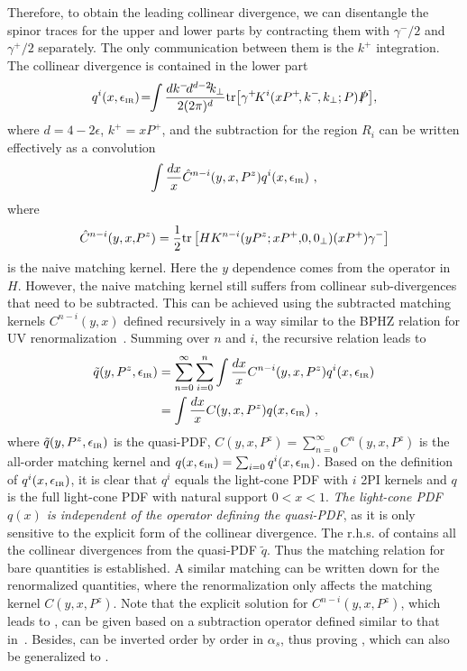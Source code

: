 Therefore, to obtain the leading collinear divergence, we can disentangle the spinor traces for the upper and lower parts by contracting them with $\gamma^-/2$ and $\gamma^+/2$ separately. The only communication between them is the $k^+$ integration. The collinear divergence is contained in the lower part
\begin{align}
	q^{i}(x,\epsilon_{\mbox{\tiny IR}})\!=\!\!\int \frac{dk^-\!d^{d-2}\!k_\perp}{2(2\pi)^{d}}{\rm tr} \big[\gamma^+\! K^i(xP^+\!,k^-\!,k_\perp;P)\slashed{P}\big],
\end{align}
where $d=4-2\epsilon$, $k^+=xP^+$, and the subtraction for the region $R_i$ can be written effectively as a convolution
\begin{align}
	\int \frac{dx}{x} \hat C^{n-i}(y,x,P^z)q^i(x,\epsilon_{\mbox{\tiny IR}}) \ ,
\end{align}
where
\begin{align}
	\hat C^{n-i}(y,x,\!P^z)=\frac{1}{2}{\rm tr}\left[HK^{n-i}(yP^z;xP^+,\!0,0_\perp)(xP^+)\gamma^-\right]
\end{align}
is the naive matching kernel. Here the $y$ dependence comes from the operator in $H$. However, the naive matching kernel still suffers from collinear sub-divergences that need to be subtracted. This can be achieved using the subtracted matching kernels $C^{n-i}(y,x)$ defined recursively in a way similar to the BPHZ relation for UV renormalization~\cite{Collins:2011zzd}. Summing over $n$ and $i$, the recursive relation leads to
\begin{align}\label{eq:subtraction}
	\tilde q(y,P^z,\epsilon_{\mbox{\tiny IR}})&=\sum_{n=0}^{\infty}\sum_{i=0}^n \int \frac{dx}{x} C^{n-i}(y,x,P^z)q^i(x,\epsilon_{\mbox{\tiny IR}})\nn\\
	&=\int \frac{dx}{x} C(y,x,P^z)q(x,\epsilon_{\mbox{\tiny IR}}) \ ,
\end{align}
where $\tilde q(y,P^z,\epsilon_{\mbox{\tiny IR}})$ is the quasi-PDF, $C(y,x,P^z)=\sum_{n=0}^{\infty} C^{n}(y,x,P^z)$ is the all-order matching kernel and $q(x,\epsilon_{\mbox{\tiny IR}})=\sum_{i=0} q^i(x,\epsilon_{\mbox{\tiny IR}})$. Based on the definition of $q^i(x,\epsilon_{\mbox{\tiny IR}})$, it is clear that $q^i$ equals the light-cone PDF with $i$ 2PI kernels and $q$ is the full light-cone PDF with natural support $0<x<1$. {\it The light-cone PDF $q(x)$ is independent of the operator defining the quasi-PDF}, as it is only sensitive to the explicit form of the collinear divergence. The r.h.s. of  contains all the collinear divergences from the quasi-PDF $\tilde q$. Thus the matching relation for bare quantities is established. A similar matching can be written down for the renormalized quantities, where the renormalization only affects the matching kernel $C(y,x,P^z)$. Note that the explicit solution for $C^{n-i}(y,x,P^z)$, which leads to , can be given based on a subtraction operator defined similar to that in~\cite{Collins:2011zzd}. Besides,  can be inverted order by order in $\alpha_s$, thus proving , which can also be generalized to .

